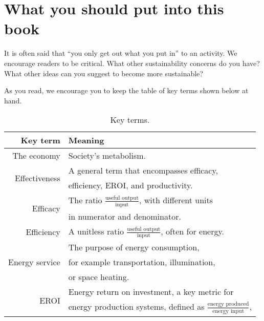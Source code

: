 {%
\section*{What you should put into this book} 

It is often said that ``you only get out what you put in'' to an activity.
We encourage readers to be critical.
What other sustainability concerns do you have?
What other ideas can you suggest to become more sustainable?

As you read, we encourage you to keep the table of key terms shown below at hand.

\begin{table}[h!]
\caption{Key terms.}
\centering
\begin{tabular}{r l}
\toprule
Key term              & Meaning  \\ 
\midrule  
The economy           & Society's metabolism. \vspace{4mm} \\
%
\multirow{2}{*}{Effectiveness}  & A general term that encompasses efficacy, \\
                                & efficiency, EROI, and productivity. \vspace{4mm} \\
%
\multirow{2}{*}{Efficacy}   & The ratio $\frac{\text{useful output}}{\text{input}}$, with different units \\
                            & in numerator and denominator. \vspace{4mm} \\
%
Efficiency            & A unitless ratio $\frac{\text{useful output}}{\text{input}}$, often for energy. \vspace{4mm} \\
%
\multirow{3}{*}{Energy service}   & The purpose of energy consumption, \\
                                  & for example transportation, illumination, \\
                                  & or space heating. \vspace{4mm} \\
%
\multirow{3}{*}{EROI} & Energy return on investment, a key metric for \\
                      & energy production systems, defined as $\frac{\text{energy produced}}{\text{energy input}}$, \\

\end{tabular}
\end{table}}
